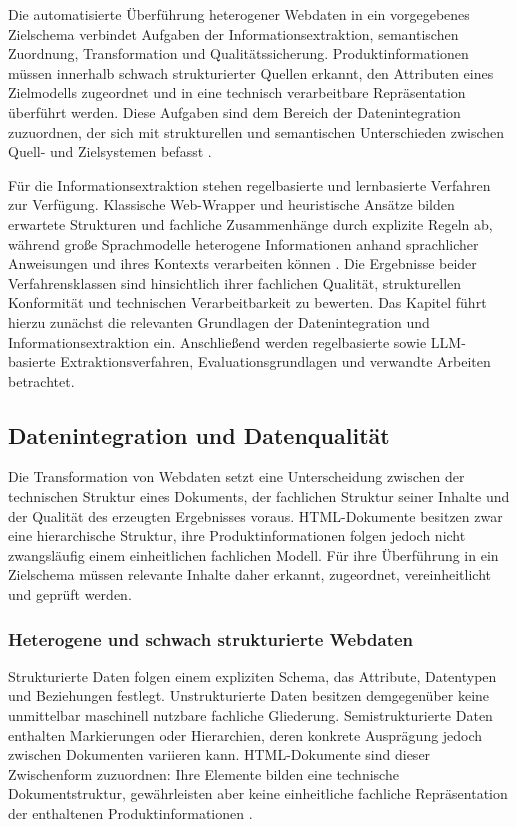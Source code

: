 Die automatisierte Überführung heterogener Webdaten in ein vorgegebenes Zielschema verbindet Aufgaben der Informationsextraktion, semantischen Zuordnung, Transformation 
und Qualitätssicherung. Produktinformationen müssen innerhalb schwach strukturierter Quellen erkannt, den Attributen eines Zielmodells zugeordnet und in eine technisch 
verarbeitbare Repräsentation überführt werden. Diese Aufgaben sind dem Bereich der Datenintegration zuzuordnen, der sich mit strukturellen und semantischen Unterschieden 
zwischen Quell- und Zielsystemen befasst \cite{doan2012principles}.

Für die Informationsextraktion stehen regelbasierte und lernbasierte Verfahren zur Verfügung. Klassische Web-Wrapper und heuristische Ansätze bilden erwartete Strukturen 
und fachliche Zusammenhänge durch explizite Regeln ab, während große Sprachmodelle heterogene Informationen anhand sprachlicher Anweisungen und ihres Kontexts verarbeiten 
können \cite{ferrara2014web,data_extraction_ai}. Die Ergebnisse beider Verfahrensklassen sind hinsichtlich ihrer fachlichen Qualität, strukturellen Konformität und technischen 
Verarbeitbarkeit zu bewerten. Das Kapitel führt hierzu zunächst die relevanten Grundlagen der Datenintegration und Informationsextraktion ein. Anschließend werden 
regelbasierte sowie LLM-basierte Extraktionsverfahren, Evaluationsgrundlagen und verwandte Arbeiten betrachtet.

\subsection{Datenintegration und Datenqualität}

Die Transformation von Webdaten setzt eine Unterscheidung zwischen der technischen Struktur eines Dokuments, der fachlichen Struktur seiner Inhalte und der Qualität des 
erzeugten Ergebnisses voraus. HTML-Dokumente besitzen zwar eine hierarchische Struktur, ihre Produktinformationen folgen jedoch nicht zwangsläufig einem einheitlichen 
fachlichen Modell. Für ihre Überführung in ein Zielschema müssen relevante Inhalte daher erkannt, zugeordnet, vereinheitlicht und geprüft werden.

\subsubsection{Heterogene und schwach strukturierte Webdaten}

Strukturierte Daten folgen einem expliziten Schema, das Attribute, Datentypen und Beziehungen festlegt. Unstrukturierte Daten besitzen demgegenüber keine unmittelbar 
maschinell nutzbare fachliche Gliederung. Semistrukturierte Daten enthalten Markierungen oder Hierarchien, deren konkrete Ausprägung jedoch zwischen Dokumenten variieren 
kann. HTML-Dokumente sind dieser Zwischenform zuzuordnen: Ihre Elemente bilden eine technische Dokumentstruktur, gewährleisten aber keine einheitliche fachliche 
Repräsentation der enthaltenen Produktinformationen \cite{doan2012principles,ferrara2014web}.

